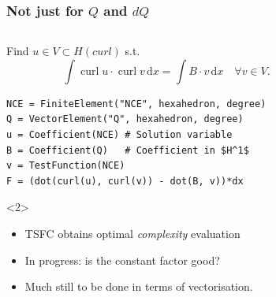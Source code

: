 \documentclass[presentation]{beamer}
\DeclareMathOperator{\curl}{curl}
\begin{document}
\begin{frame}[fragile]
  \frametitle{Not just for $Q$ and $dQ$}
  \begin{columns}
    \begin{column}{0.5\textwidth}
      \begin{block}{}
        Find $u \in V \subset H(curl)$ s.t.
        {\scriptsize \begin{equation*}
          \int\!\!\curl u \cdot \curl v \,\text{d}x = \int\!\!B\cdot
          v\,\text{d}x \quad \forall v \in V.
        \end{equation*}}
\begin{verbatim}
NCE = FiniteElement("NCE", hexahedron, degree)
Q = VectorElement("Q", hexahedron, degree)
u = Coefficient(NCE) # Solution variable
B = Coefficient(Q)   # Coefficient in $H^1$
v = TestFunction(NCE)
F = (dot(curl(u), curl(v)) - dot(B, v))*dx
\end{verbatim}
    \end{block}
    {\scriptsize
      \begin{uncoverenv}<2>
        \begin{itemize}
        \item TSFC obtains optimal \emph{complexity} evaluation
        \item In progress: is the constant factor good?
        \item Much still to be done in terms of vectorisation.
        \end{itemize}
      \end{uncoverenv}
      }
    \end{column}
  \begin{column}{0.6\textwidth}
  \begin{center}
\end{center}
\end{column}
\end{columns}
\end{frame}
\end{document}
